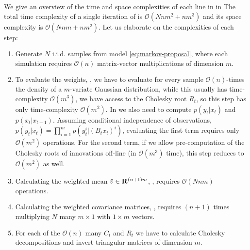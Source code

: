 We give an overview of the time and space complexities of each line in  in 
The total time complexity of a single iteration of  is $\mathcal O \left( Nnm^{2} + nm^{3}\right)$ and its space complexity is $\mathcal O \left( Nnm + nm^{2}\right)$. Let us elaborate on the complexities of each step:
\begin{enumerate}
    \item[\Cref{step:cem-simulate}] Generate $N$ i.i.d. samples from model \eqref{eq:markov-proposal}, where each simulation requires $\mathcal O(n)$ matrix-vector multiplications of dimension $m$. 
    \item[\Cref{step:cem-weights}] To evaluate the weights, , we have to evaluate for every sample $\mathcal O(n)$-times the density of a $m$-variate Gaussian distribution, while this usually has time-complexity $\mathcal O(m^{3})$, we have access to the Cholesky root $R_{t}$, so this step has only time-complexity $\mathcal O(m^{2})$. In  we also need to compute $p(y_{t}|x_{t})$ and $p(x_{t}|x_{t - 1})$. Assuming conditional independence of observations, $p(y_{t}|x_{t}) = \prod_{i = 1}^{m}p(y_{t}^i|(B_{t}x_{t})^{i})$, evaluating the first term requires only $\mathcal O(m^{2})$ operations. For the second term, if we allow pre-computation of the Cholesky roots of innovations off-line (in $\mathcal O(m^{3})$ time), this step reduces to $\mathcal O(m^{2})$ as well.  
    \item[\Cref{step:cem-est_v}] Calculating the weighted mean $\hat v \in\mathbf R^{(n+1)m}$, , requires $\mathcal O(Nnm)$ operations.
    \item[\Cref{step:cem-est_cov}] Calculating the weighted covariance matrices, , requires $(n+1)$ times multiplying $N$ many $m\times 1$ with $1 \times m$ vectors. 
    \item[\Cref{step:cem-C_R}] For each of the $\mathcal O(n)$ many $C_{t}$ and $R_{t}$ we have to calculate Cholesky decompositions and invert triangular matrices of dimension $m$. 
\end{enumerate}


